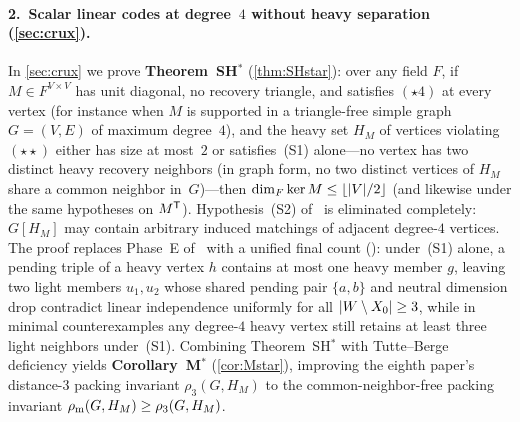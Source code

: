 \paragraph{2.\ Scalar linear codes at degree~$4$ without heavy separation (\cref{sec:crux}).}
In \cref{sec:crux} we prove \textbf{Theorem~SH$^*$} (\cref{thm:SHstar}): over any field $F$, if $M \in F^{V \times V}$
has unit diagonal, no recovery triangle, and satisfies $(\star 4)$ at every vertex (for instance when $M$ is supported in a
triangle-free simple graph $G = (V, E)$ of maximum degree~$4$), and the heavy set $H_M$ of vertices violating $(\star\star)$
either has size at most~$2$ or satisfies~(S1) alone---no vertex has two distinct heavy recovery neighbors (in graph form,
no two distinct vertices of $H_M$ share a common neighbor in~$G$)---then $\dim_F \ker M \le \lfloor \lvert V \rvert/2 \rfloor$
(and likewise under the same hypotheses on $M^{\mathsf{T}}$). Hypothesis~(S2) of~\cite{EighthPaper2026} is eliminated
completely: $G[H_M]$ may contain arbitrary induced matchings of adjacent degree-$4$ vertices. The proof replaces Phase~E
of~\cite{EighthPaper2026} with a unified final count (): under~(S1) alone, a pending triple of a heavy vertex
$h$ contains at most one heavy member $g$, leaving two light members $u_1, u_2$ whose shared pending pair $\{a, b\}$ and
neutral dimension drop contradict linear independence uniformly for all $\lvert W \setminus X_0 \rvert \ge 3$, while in minimal
counterexamples any degree-$4$ heavy vertex still retains at least three light neighbors under~(S1). Combining
Theorem~SH$^*$ with Tutte--Berge deficiency yields \textbf{Corollary~M$^*$} (\cref{cor:Mstar}), improving the eighth
paper's distance-$3$ packing invariant $\rho_3(G, H_M)$ to the common-neighbor-free packing invariant
$\rho_{\mathrm{m}}(G, H_M) \ge \rho_3(G, H_M)$.

